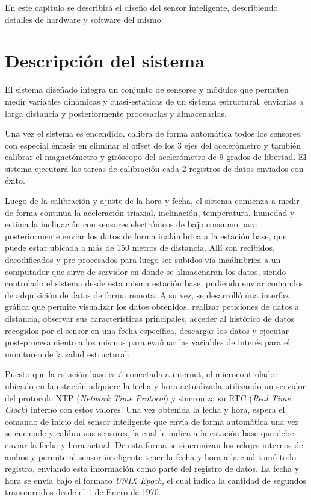 En este capítulo se describirá el diseño del sensor inteligente, describiendo detalles de hardware y software del mismo.

\section{Descripción del sistema}

El sistema diseñado integra un conjunto de sensores y módulos que permiten medir variables dinámicas y cuasi-estáticas de un sistema estructural, enviarlas a larga distancia y posteriormente procesarlas y almacenarlas.

Una vez el sistema es encendido, calibra de forma automática todos los sensores, con especial énfasis en eliminar el offset de los 3 ejes del acelerómetro y también calibrar el magnetómetro y giróscopo del acelerómetro de 9 grados de libertad. El sistema ejecutará las tareas de calibración cada 2 registros de datos enviados con éxito.

Luego de la calibración y ajuste de la hora y fecha,  el sistema comienza a medir de forma continua la aceleración triaxial, inclinación, temperatura, humedad y estima la inclinación con sensores electrónicos de bajo consumo para posteriormente enviar los datos de forma inalámbrica a la estación base, que puede estar ubicada a más de 150 metros de distancia. Allí son recibidos, decodificados y pre-procesados para luego ser subidos vía inaálmbrica a un computador que sirve de servidor en donde se almacenaran los datos, siendo controlado el sistema desde esta misma estación base, pudiendo enviar comandos de adquisición de datos de forma remota. A su vez, se desarrolló una interfaz gráfica que permite visualizar los datos obtenidos, realizar peticiones de datos a distancia, observar sus características principales, acceder al histórico de datos recogidos por el sensor en una fecha específica, descargar los datos y ejecutar post-procesamiento a los mismos para evañuar las variables de interés para el monitoreo de la salud estructural.

Puesto que la estación base está conectada a internet, el microcontrolador ubicado en la estación adquiere la fecha y hora actualizada utilizando un servidor del protocolo NTP (\textit{Network Time Protocol}) y sincroniza su RTC (\textit{Real Time Clock}) interno con estos valores. Una vez obtenida la fecha y hora, espera el comando de inicio del sensor inteligente que envía de forma automática una vez se enciende y calibra sus sensores, la cual le indica a la estación base que debe enviar la fecha y hora actual. De esta forma se sincronizan los relojes internos de ambos y permite al sensor inteligente tener la fecha y hora a la cual tomó todo registro, enviando esta información como parte del registro de datos. La fecha y hora se envía bajo el formato \textit{UNIX Epoch}, el cual indica la cantidad de segundos transcurridos desde el 1 de Enero de 1970.
	
